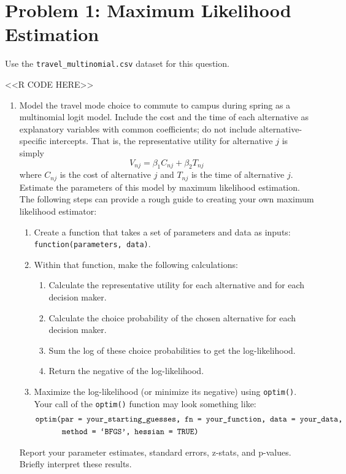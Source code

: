 \documentclass[11pt,letterpaper]{article}
\begin{document}
\section*{Problem 1: Maximum Likelihood Estimation}

Use the \texttt{travel\_multinomial.csv} dataset for this question.

<<R CODE HERE>>

\begin{enumerate}[label=\alph*., leftmargin=*]
	\item Model the travel mode choice to commute to campus during spring as a multinomial logit model. Include the cost and the time of each alternative as explanatory variables with common coefficients; do not include alternative-specific intercepts. That is, the representative utility for alternative $j$ is simply
	$$V_{nj} = \beta_1 C_{nj} + \beta_2 T_{nj}$$
	where $C_{nj}$ is the cost of alternative $j$ and $T_{nj}$ is the time of alternative $j$. Estimate the parameters of this model by maximum likelihood estimation. The following steps can provide a rough guide to creating your own maximum likelihood estimator:
	\begin{enumerate}[label=\Roman*.]
		\item Create a function that takes a set of parameters and data as inputs: \texttt{function(parameters, data)}.
		\item Within that function, make the following calculations:
		\begin{enumerate}[label=\roman*.]
			\item Calculate the representative utility for each alternative and for each decision maker.
			\item Calculate the choice probability of the chosen alternative for each decision maker.
			\item Sum the log of these choice probabilities to get the log-likelihood.
			\item Return the negative of the log-likelihood.
		\end{enumerate}
		\item Maximize the log-likelihood (or minimize its negative) using \texttt{optim()}. Your call of the \texttt{optim()} function may look something like:
		\begin{align*}
			&\text{\texttt{optim(par = your\_starting\_guesses, fn = your\_function, data = your\_data,}} \\
			& \qquad \quad \; \text{\texttt{method = `BFGS', hessian = TRUE)}}
		\end{align*}
	\end{enumerate}
	Report your parameter estimates, standard errors, z-stats, and p-values. Briefly interpret these results.


\end{enumerate}
\end{document}
